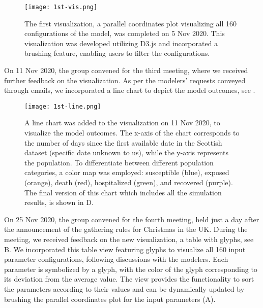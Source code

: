 \begin{figure}[tb!]
    \centering
    \texttt{[image: 1st-vis.png]}
    \caption{The first visualization, a parallel coordinates plot visualizing all 160 configurations of the model, was completed on 5 Nov 2020. This visualization was developed utilizing D3.js and incorporated a brushing feature, enabling users to filter the configurations.
    }
    \label{fig:1st-vis}

\end{figure}


On 11 Nov 2020, the group convened for the third meeting, where we received further feedback on the visualization. As per the modelers' requests conveyed through emails, we incorporated a line chart to depict the model outcomes, see .

\begin{figure}[tb!]
    \centering
    \texttt{[image: 1st-line.png]}
    \caption{A line chart was added to the visualization on 11 Nov 2020, to visualize the model outcomes.
    The x-axis of the chart corresponds to the number of days since the first available date in the Scottish dataset (specific date unknown to us), while the y-axis represents the population.
    To differentiate between different population categories, a color map was employed: susceptible (blue), exposed (orange), death (red), hospitalized (green), and recovered (purple).
    The final version of this chart which includes all the simulation results, is shown in D.
    }
    \label{fig:1st-line}

\end{figure}


On 25 Nov 2020, the group convened for the fourth meeting, held just a day after the announcement of the gathering rules for Christmas in the UK.
During the meeting, we received feedback on the new visualization, a table with glyphs, see B. We incorporated this table view featuring glyphs to visualize all 160 input parameter configurations, following discussions with the modelers.
Each parameter is symbolized by a glyph, with the color of the glyph corresponding to its deviation from the average value.
The view provides the functionality to sort the parameters according to their values and can be dynamically updated by brushing the parallel coordinates plot for the input parameters (A).

